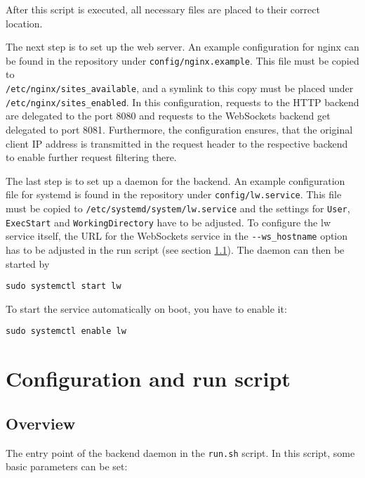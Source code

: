 After this script is executed, all necessary files are placed to their correct location.

The next step is to set up the web server. An example configuration for nginx can be found
in the repository under \verb|config/nginx.example|. This file must be copied to\\ \verb|/etc/nginx/sites_available|,
and a symlink to this copy must be placed under\\ \verb|/etc/nginx/sites_enabled|. In this configuration, requests to
the HTTP backend are delegated to the port 8080 and requests to the WebSockets backend get delegated to port 8081.
Furthermore, the configuration ensures, that the original client IP address is transmitted in the request header to
the respective backend to enable further request filtering there.

The last step is to set up a daemon for the backend. An example configuration file for systemd is found in the
repository under \verb|config/lw.service|. This file must be copied to \verb|/etc/systemd/system/lw.service|
and the settings for \verb|User|, \verb|ExecStart| and \verb|WorkingDirectory| have to be adjusted.
To configure the lw service itself, the URL for the WebSockets service in the \verb|--ws_hostname| option has to be
adjusted in the run script (see section \ref{section:config}).
The daemon can then be started by
\begin{verbatim}
sudo systemctl start lw
\end{verbatim}
To start the service automatically on boot, you have to enable it:
\begin{verbatim}
sudo systemctl enable lw
\end{verbatim}

\section{Configuration and run script}
\subsection{Overview}
\label{section:config}
The entry point of the backend daemon in the \verb|run.sh| script. In this script, some basic
parameters can be set:

